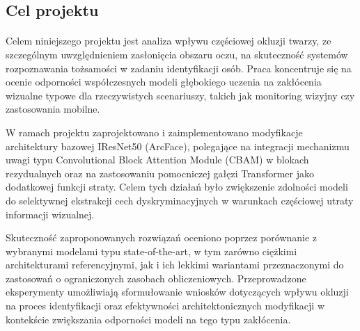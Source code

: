 \subsection{Cel projektu}

\paragraph{}Celem niniejszego projektu jest analiza wpływu częściowej okluzji twarzy, ze szczególnym uwzględnieniem zasłonięcia obszaru oczu, na skuteczność systemów rozpoznawania tożsamości w zadaniu identyfikacji osób. Praca koncentruje się na ocenie odporności współczesnych modeli głębokiego uczenia na zakłócenia wizualne typowe dla rzeczywistych scenariuszy, takich jak monitoring wizyjny czy zastosowania mobilne.

W ramach projektu zaprojektowano i zaimplementowano modyfikacje architektury bazowej IResNet50 (ArcFace), polegające na integracji mechanizmu uwagi typu Convolutional Block Attention Module (CBAM) w blokach rezydualnych oraz na zastosowaniu pomocniczej gałęzi Transformer jako dodatkowej funkcji straty. Celem tych działań było zwiększenie zdolności modeli do selektywnej ekstrakcji cech dyskryminacyjnych w warunkach częściowej utraty informacji wizualnej.

Skuteczność zaproponowanych rozwiązań oceniono poprzez porównanie z wybranymi modelami typu state-of-the-art, w tym zarówno ciężkimi architekturami referencyjnymi, jak i ich lekkimi wariantami przeznaczonymi do zastosowań o ograniczonych zasobach obliczeniowych. Przeprowadzone eksperymenty umożliwiają sformułowanie wniosków dotyczących wpływu okluzji na proces identyfikacji oraz efektywności architektonicznych modyfikacji w kontekście zwiększania odporności modeli na tego typu zakłócenia.